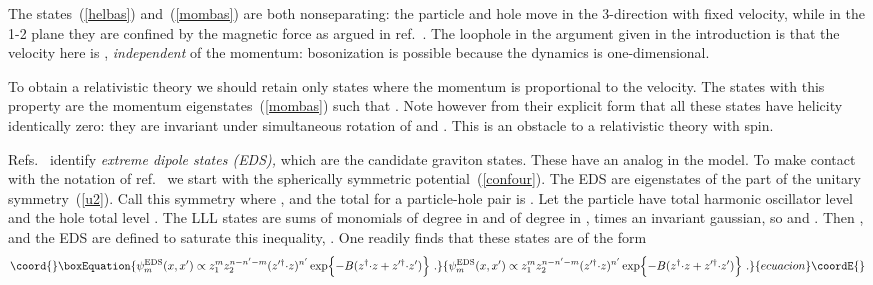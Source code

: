 \documentclass[a4paper,12pt]{article}
\providecommand{\OL}[1]{ \hspace{1pt}\overline{\hspace{-1pt}#1
   \hspace{-2pt}}\hspace{2pt} }
\begin{document}
The states~(\ref{helbas}) and~(\ref{mombas}) are both nonseparating:
the particle and hole move in the 3-direction with fixed velocity, while
in the 1-2 plane they are confined by the magnetic force as
argued in ref.~\cite{hz1}.  The loophole in the argument given in the
introduction is that the velocity here is \coordHE{}, {\it
independent} of the momentum: bosonization is possible because the
dynamics is one-dimensional. 

To obtain a relativistic theory we should retain only states where the
momentum is proportional to the velocity.  The states with this property
are the momentum eigenstates~(\ref{mombas}) such that \coordHE{}. 
Note however from their explicit form that all these states have helicity
identically zero: they are invariant under simultaneous rotation of \coordHE{}
and \coordHE{}.  This is an obstacle to a relativistic theory
with spin.  

Refs.~\cite{hz1,hz2} identify {\it extreme dipole states (EDS),} which are
the candidate graviton states.  These have an analog in the \coordHE{} model. 
To make contact with the notation of ref.~\cite{hz2} we start with the
spherically symmetric potential~(\ref{confour}).  The EDS are
eigenstates of the
\coordHE{} part of the unitary symmetry~(\ref{u2}).  Call this symmetry
\coordHE{} where \coordHE{}, and the total for a particle-hole pair is \coordHE{}.  Let the particle have total harmonic oscillator level
\coordHE{} and the hole total level
\coordHE{}.  The LLL states are sums of monomials of degree \coordHE{} in \coordHE{} and of
degree \coordHE{} in \myHighlight{$\OL{z_\beta}'$}\coordHE{}, times an invariant gaussian, so \coordHE{} and
\coordHE{}.  Then \coordHE{}, and the EDS are defined to saturate
this inequality, \coordHE{}.  One readily finds that these states are
of the form
\begin{equation}\coord{}\boxEquation{
\psi^{\rm EDS}_m(x,x') \propto z_1^m z_2^{n - n' - m} (z'^\dagger{\cdot}
z)^{n'}
\exp\Bigl\{ -B( z^\dagger{\cdot} z + z'^\dagger{\cdot} z'
)\Bigr\}\ .
\label{eds}
}{
\psi^{\rm EDS}_m(x,x') \propto z_1^m z_2^{n - n' - m} (z'^\dagger{\cdot}
z)^{n'}
\exp\Bigl\{ -B( z^\dagger{\cdot} z + z'^\dagger{\cdot} z'
)\Bigr\}\ .
}{ecuacion}\coordE{}\end{equation}
\end{document}
